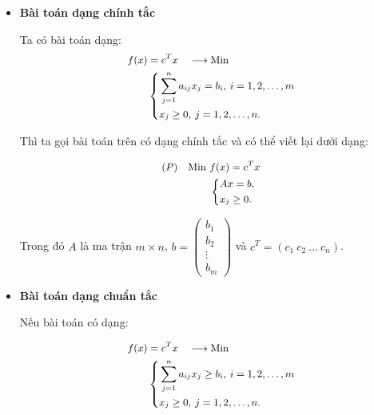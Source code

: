 \documentclass[12pt,a4paper]{report}
\begin{document}
\begin{itemize}
    \item \textbf{Bài toán dạng chính tắc}
    
    Ta có bài toán dạng:
    \begin{equation} \small \label{F}
        \begin{split}
        f(x) & = c^Tx \quad \longrightarrow \text{Min} \\
            & \left\{
            \begin{split}
            & \sum _{j=1}^n a_{ij} x_j = b_i, \: i=1,2,\ldots,m \\
            & x_j \geq 0, \: j=1,2,\ldots,n.
            \end{split}
            \right.    
        \end{split}
    \end{equation}

    Thì ta gọi bài toán trên có dạng chính tắc và có thể viết lại dưới dạng:

    \begin{equation} \small \label{chinhtac}
        \begin{split}
        (P) \quad \text{Min } & f(x) = c^Tx \\
            & \left\{
            \begin{split}
            & Ax=b, \\
            & x_j \geq 0.
            \end{split}
            \right.    
        \end{split}
    \end{equation}

    Trong đó $A$ là ma trận $m\times n$, $b=\begin{pmatrix}
        b_1 \\
        b_2 \\
        \vdots \\
        b_m
        \end{pmatrix}$ và $c^T=(c_1 \: c_2 \: \ldots \: c_n)$.

    \item \textbf{Bài toán dạng chuẩn tắc}
    
    Nếu bài toán có dạng:

    \begin{equation} \small \label{F}
        \begin{split}
        f(x) & = c^Tx \quad \longrightarrow \text{Min} \\
            & \left\{
            \begin{split}
            & \sum _{j=1}^n a_{ij} x_j \geq b_i, \: i=1,2,\ldots,m \\
            & x_j \geq 0, \: j=1,2,\ldots,n.
            \end{split}
            \right.    
        \end{split}
    \end{equation}


\end{itemize}
\end{document}
